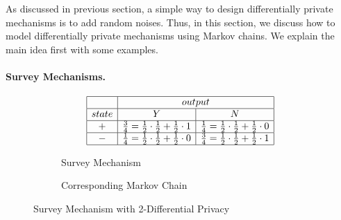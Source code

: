 As discussed in previous section, a simple way to design differentially private mechanisms is to add
random noises. 
Thus, in this section, we discuss how to model differentially private mechanisms using Markov chains. We explain the main idea first with some examples.

\paragraph{Survey Mechanisms.}

\begin{figure}
  \centering
  \begin{subfigure}{.48\columnwidth}
      \[
      \begin{array}{|c|c|c|}
        \hline
        &
        \multicolumn{2}{c|}{output}
        \\
        \hline
        state & Y & N \\
        \hline
        + & \frac{3}{4} = \frac{1}{2} \cdot \frac{1}{2} + \frac{1}{2} \cdot 1
          & \frac{1}{4} = \frac{1}{2} \cdot \frac{1}{2} + \frac{1}{2} \cdot 0
        \\
        \hline
        - & \frac{1}{4} = \frac{1}{2} \cdot \frac{1}{2} + \frac{1}{2} \cdot 0
          & \frac{3}{4} = \frac{1}{2} \cdot \frac{1}{2} + \frac{1}{2} \cdot 1
        \\
        \hline
      \end{array}
      \]
    \caption{Survey Mechanism}
    \label{figure:2-dp-table}
  \end{subfigure}
  \hspace{.05\columnwidth}
  \begin{subfigure}{.40\columnwidth}
    \caption{Corresponding Markov Chain}
    \label{figure:2-dp-mdp}
  \end{subfigure}
  \caption{Survey Mechanism with 2-Differential Privacy}
  \label{figure:2-dp}
\end{figure}

